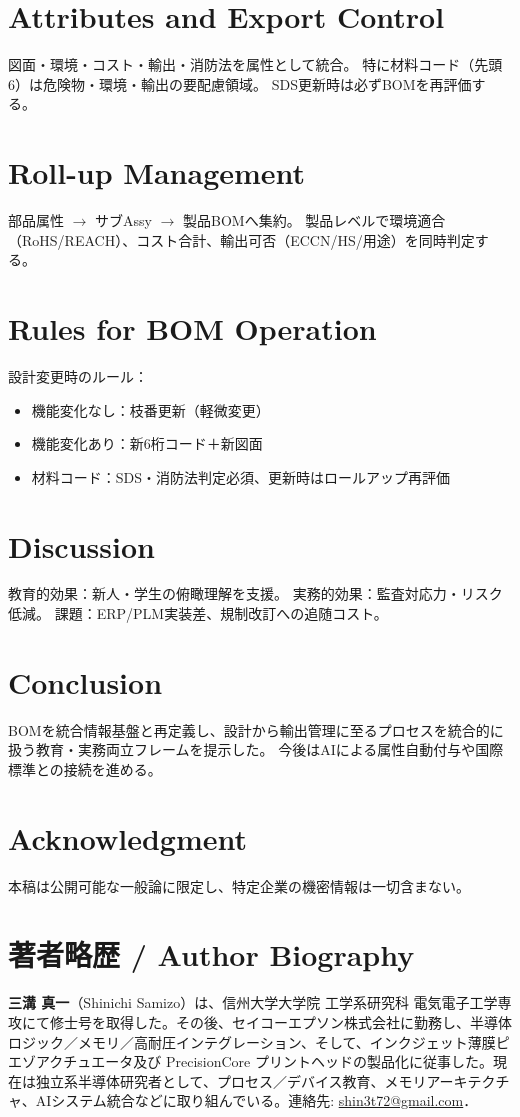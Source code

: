 \documentclass[conference]{IEEEtran}
\begin{document}
\section{Attributes and Export Control}
図面・環境・コスト・輸出・消防法を属性として統合。  
特に材料コード（先頭6）は危険物・環境・輸出の要配慮領域。  
SDS更新時は必ずBOMを再評価する。

\section{Roll-up Management}
部品属性 $\rightarrow$ サブAssy $\rightarrow$ 製品BOMへ集約。  
製品レベルで環境適合（RoHS/REACH）、コスト合計、輸出可否（ECCN/HS/用途）を同時判定する。

\section{Rules for BOM Operation}
設計変更時のルール：
\begin{itemize}
  \item 機能変化なし：枝番更新（軽微変更）
  \item 機能変化あり：新6桁コード＋新図面
  \item 材料コード：SDS・消防法判定必須、更新時はロールアップ再評価
\end{itemize}

\section{Discussion}
教育的効果：新人・学生の俯瞰理解を支援。  
実務的効果：監査対応力・リスク低減。  
課題：ERP/PLM実装差、規制改訂への追随コスト。

\section{Conclusion}
BOMを統合情報基盤と再定義し、設計から輸出管理に至るプロセスを統合的に扱う教育・実務両立フレームを提示した。  
今後はAIによる属性自動付与や国際標準との接続を進める。

\section*{Acknowledgment}
本稿は公開可能な一般論に限定し、特定企業の機密情報は一切含まない。



\section*{著者略歴 / Author Biography}
\noindent\textbf{三溝 真一}（Shinichi Samizo）は、信州大学大学院 工学系研究科 電気電子工学専攻にて修士号を取得した。その後、セイコーエプソン株式会社に勤務し、半導体ロジック／メモリ／高耐圧インテグレーション、そして、インクジェット薄膜ピエゾアクチュエータ及び PrecisionCore プリントヘッドの製品化に従事した。現在は独立系半導体研究者として、プロセス／デバイス教育、メモリアーキテクチャ、AIシステム統合などに取り組んでいる。連絡先: \href{mailto:shin3t72@gmail.com}{shin3t72@gmail.com}．
\end{document}
